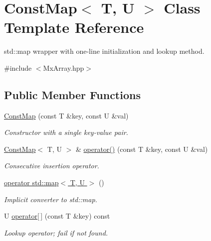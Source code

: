 \hypertarget{class_const_map}{\section{\-Const\-Map$<$ \-T, \-U $>$ \-Class \-Template \-Reference}
\label{class_const_map}
}


std\-::map wrapper with one-\/line initialization and lookup method.  




{\ttfamily \#include $<$\-Mx\-Array.\-hpp$>$}

\subsection*{\-Public \-Member \-Functions}
\begin{DoxyCompactItemize}
\item 
\hypertarget{class_const_map_a1d86f17601daedfa9ed2925805ac0e03}{\hyperlink{class_const_map_a1d86f17601daedfa9ed2925805ac0e03}{\-Const\-Map} (const \-T \&key, const \-U \&val)}\label{class_const_map_a1d86f17601daedfa9ed2925805ac0e03}

\begin{DoxyCompactList}\small\item\em \-Constructor with a single key-\/value pair. \end{DoxyCompactList}\item 
\hypertarget{class_const_map_a67bed6f2e079b458118b60afc0fe1938}{\hyperlink{class_const_map}{\-Const\-Map}$<$ \-T, \-U $>$ \& \hyperlink{class_const_map_a67bed6f2e079b458118b60afc0fe1938}{operator()} (const \-T \&key, const \-U \&val)}\label{class_const_map_a67bed6f2e079b458118b60afc0fe1938}

\begin{DoxyCompactList}\small\item\em \-Consecutive insertion operator. \end{DoxyCompactList}\item 
\hypertarget{class_const_map_a1124f9bea1fbd2d3a40cead6560d5de2}{\hyperlink{class_const_map_a1124f9bea1fbd2d3a40cead6560d5de2}{operator std\-::map$<$ T, U $>$} ()}\label{class_const_map_a1124f9bea1fbd2d3a40cead6560d5de2}

\begin{DoxyCompactList}\small\item\em \-Implicit converter to std\-::map. \end{DoxyCompactList}\item 
\hypertarget{class_const_map_a160ff477dd3d840b4c614e94dcc2cde8}{\-U \hyperlink{class_const_map_a160ff477dd3d840b4c614e94dcc2cde8}{operator\mbox{[}$\,$\mbox{]}} (const \-T \&key) const }\label{class_const_map_a160ff477dd3d840b4c614e94dcc2cde8}

\begin{DoxyCompactList}\small\item\em \-Lookup operator; fail if not found. \end{DoxyCompactList}\end{DoxyCompactItemize}


